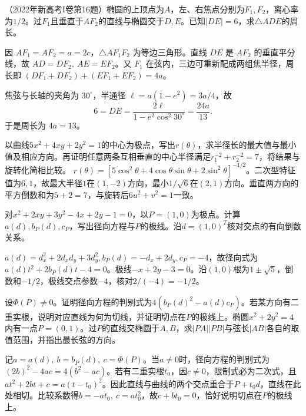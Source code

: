 （2022年新高考I卷第16题）椭圆的上顶点为\(A\)，左、右焦点分别为\(F_1,F_2\)，离心率为\(1/2\)。过\(F_1\)且垂直于\(AF_2\)的直线与椭圆交于\(D,E\)。已知\(|DE|=6\)，求\(\triangle ADE\)的周长。
\par
\solutionanswer
因 \(AF_1=AF_2=a=2c\)，\(\triangle AF_1F_2\) 为等边三角形。直线 \(DE\) 是 \(AF_2\) 的垂直平分线，故 \(AD=DF_2,\ AE=EF_2\)。又 \(F_1\) 在弦内，三边可重新配成两组焦半径，周长即 \((DF_1+DF_2)+(EF_1+EF_2)=4a\)。

焦弦与长轴的夹角为 \(30^\circ\)，半通径 \(\ell=a(1-e^2)=3a/4\)，故
\[
 6=DE=\frac{2\ell}{1-e^2\cos^2 30^\circ}=\frac{24a}{13}.
\]
于是周长为 \(4a=13\)。

以曲线\(5x^2+4xy+2y^2=1\)的中心为极点，写出\(r(\theta)\)，求半径长的最大值与最小值及相应方向。再证明任意两条互相垂直的中心半径满足\(r_1^{-2}+r_2^{-2}=7\)，将结果与旋转化简相比较。
\solutionanswer
\(r(\theta)=[5\cos^2\theta+4\cos\theta\sin\theta+2\sin^2\theta]^{-1/2}\)。二次型特征值为\(6,1\)，故最大半径\(1\)在\((1,-2)\)方向，最小\(1/\sqrt6\)在\((2,1)\)方向。垂直两方向的平方倒数和为\(5+2=7\)，与旋转后\(6u^2+v^2=1\)一致。


对\(x^2+2xy+3y^2-4x+2y-1=0\)，以\(P=(1,0)\)为极点。计算\(a(d),b_P(d),c_P\)，写出径向方程与\(P\)的极线。沿\(d=(1,0)^T\)核对交点的有向倒数关系。
\par
\solutionanswer
\(a(d)=d_x^2+2d_xd_y+3d_y^2,b_P(d)=-d_x+2d_y,c_P=-4\)，故径向式为\(a(d)t^2+2b_P(d)t-4=0\)。极线\(-x+2y-3=0\)。沿\((1,0)\)根为\(1\pm\sqrt5\)，倒数和\(-1/2\)，极线交点参数\(-4\)，核对\(2/(-4)=-1/2\)。


设\(\Phi(P)\ne0\)。证明径向方程的判别式为\(4(b_P(d)^2-a(d)c_P)\)。若某方向有二重实根，说明对应直线为何为切线，并证明切点在\(P\)的极线上。椭圆\(x^2+2y^2=4\)内有一点\(P=(0,1)\)。过\(P\)的直线交椭圆于\(A,B\)，求\(|PA||PB|\)与弦长\(|AB|\)各自的取值范围，并指出最长弦的方向。
\par
\solutionanswer
记\(a=a(d),\ b=b_P(d),\ c=\Phi(P)\)。当\(a\ne0\)时，径向方程的判别式为\((2b)^2-4ac=4(b^2-ac)\)。若有二重实根\(t_0\)，因\(c\ne0\)，限制式必为二次式，且\(at^2+2bt+c=a(t-t_0)^2\)。因此直线与曲线的两个交点重合于\(P+t_0d\)，直线在此处相切。比较系数得\(b=-at_0,\ c=at_0^2\)，故\(c+bt_0=0\)，恰好说明切点在\(P\)的极线上。


